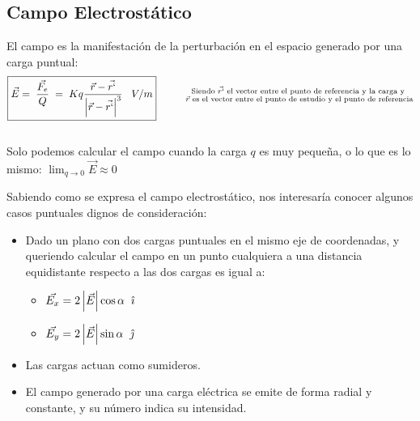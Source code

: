 \subsection{Campo Electrostático}
El campo es la manifestación de la perturbación en el espacio generado por una carga puntual:
\[
        \boxed{\vec{E} = \hspace{1mm}\frac{\vec{F_e}}{Q} \hspace{1mm}= \hspace{1mm} Kq\frac{\vec{r} -\vec{r`}}{\left | \vec{r} -\vec{r`} \right |^3} \hspace{3mm}V/m} \hspace{1cm}
        \substack{\textnormal{Siendo \(\vec{r`}\) el vector entre el punto de referencia y la carga y }
                \\
                \textnormal{\(\vec{r}\) es el vector entre el punto de estudio y el punto de referencia}
        }
\]
\\
Solo podemos calcular el campo cuando la carga \(q\) es muy pequeña, o lo que es lo mismo: \(\lim_{q \to 0} \vec{E} \approx 0\) \par
\vspace{1cm}
Sabiendo como se expresa el campo electrostático, nos interesaría conocer algunos casos puntuales dignos de consideración:
\begin{itemize}
        \item Dado un plano con dos cargas puntuales en el mismo eje de coordenadas, y queriendo calcular el campo en un punto cualquiera a una distancia equidistante respecto a las dos cargas es igual a:
              \begin{itemize}
                      \item \(\vec{E_x} = 2\left | \vec{E} \right | \cos{\alpha}\hspace{2mm} \hat{\imath}\)
                      \item \(\vec{E_y} = 2\left | \vec{E} \right | \sin{\alpha} \hspace{2mm} \hat{\jmath}\)
              \end{itemize}
        \item Las cargas actuan como sumideros.
        \item El campo generado por una carga eléctrica se emite de forma radial y constante, y su número indica su intensidad.
\end{itemize}
